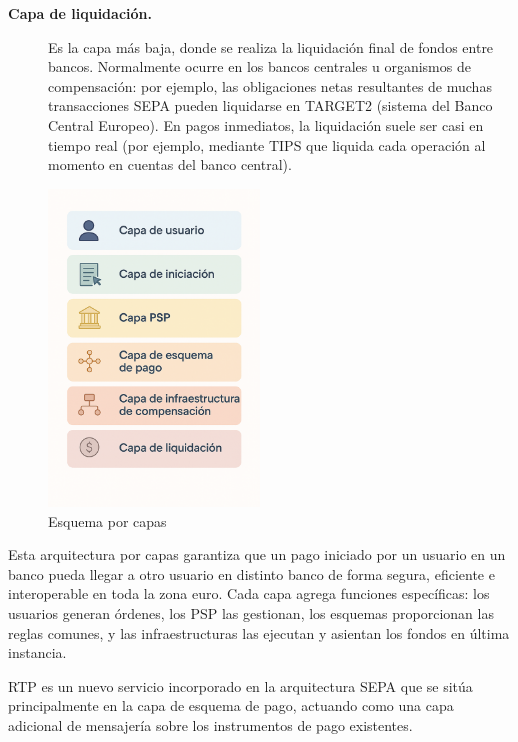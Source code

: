 \begin{description}
  \item[\textbf{Capa de liquidación.}] 
    Es la capa más baja, donde se realiza la liquidación final de fondos entre bancos. Normalmente ocurre en los bancos centrales u organismos de compensación: por ejemplo, las obligaciones netas resultantes de muchas transacciones SEPA pueden liquidarse en TARGET2 (sistema del Banco Central Europeo). En pagos inmediatos, la liquidación suele ser casi en tiempo real (por ejemplo, mediante TIPS \cite{ECB_TIPS} que liquida cada operación al momento en cuentas del banco central).
\end{description}

\begin{figure}[H]
  \centering
  \includegraphics[width=0.5\textwidth]{Imagenes/esq1.png}
  \caption{Esquema por capas}
  \label{fig:Esquema por capas}
\end{figure}

Esta arquitectura por capas garantiza que un pago iniciado por un usuario en un banco pueda llegar a otro usuario en distinto banco de forma segura, eficiente e interoperable en toda la zona euro. Cada capa agrega funciones específicas: los usuarios generan órdenes, los PSP las gestionan, los esquemas proporcionan las reglas comunes, y las infraestructuras las ejecutan y asientan los fondos en última instancia.

RTP es un nuevo servicio incorporado en la arquitectura SEPA que se sitúa principalmente en la capa de esquema de pago, actuando como una capa adicional de mensajería sobre los instrumentos de pago existentes.


